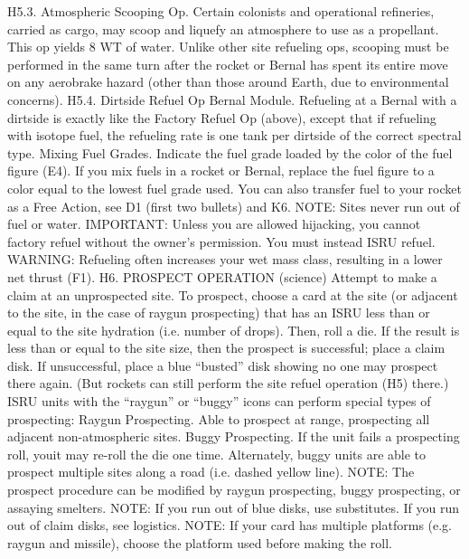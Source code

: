 \documentclass[a4paper]{book}
\begin{document}
H5.3. Atmospheric Scooping Op. Certain colonists and operational refineries, carried as cargo, may scoop and liquefy an atmosphere to use as a propellant. This op yields 8 WT of water. Unlike other site refueling ops, scooping must be performed in the same turn after the rocket or Bernal has spent its entire move on any aerobrake hazard (other than those around Earth, due to environmental concerns). 
H5.4. Dirtside Refuel Op {Bernal Module}. Refueling at a Bernal with a dirtside is exactly like the Factory Refuel Op (above), except that if refueling with isotope fuel, the refueling rate is one tank per dirtside of the correct spectral type.
Mixing Fuel Grades. Indicate the fuel grade loaded by the color of the fuel figure (E4). If you mix fuels in a rocket or Bernal, replace the fuel figure to a color equal to the lowest fuel grade used.
You can also transfer fuel to your rocket as a Free Action, see D1 (first two bullets) and K6.
NOTE: Sites never run out of fuel or water.
IMPORTANT: Unless you are allowed hijacking, you cannot factory refuel without the owner’s permission. You must instead ISRU refuel.
WARNING: Refueling often increases your wet mass class, resulting in a lower net thrust (F1).
H6. PROSPECT OPERATION (science)
Attempt to make a claim at an unprospected site. To prospect, choose a card at the site (or adjacent to the site, in the case of raygun prospecting) that has an ISRU less than or equal to the site hydration (i.e. number of drops). Then, roll a die. If the result is less than or equal to the site size, then the prospect is successful; place a claim disk. If unsuccessful, place a blue “busted” disk showing no one may prospect there again. (But rockets can still perform the site refuel operation (H5) there.) ISRU units with the “raygun” or “buggy” icons can perform special types of prospecting:
Raygun Prospecting. Able to prospect at range, prospecting all adjacent non-atmospheric sites.
Buggy Prospecting. If the unit fails a prospecting roll, youit may re-roll the die one time. Alternately, buggy units are able to prospect multiple sites along a road (i.e. dashed yellow line).
NOTE: The prospect procedure can be modified by raygun prospecting, buggy prospecting, or assaying smelters.
NOTE: If you run out of blue disks, use substitutes. If you run out of claim disks, see logistics.
NOTE: If your card has multiple platforms (e.g. raygun and missile), choose the platform used before making the roll.
\end{document}

